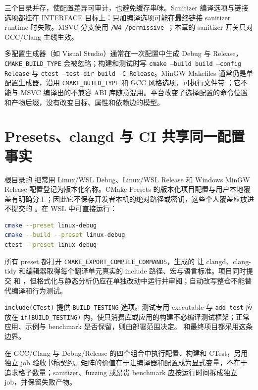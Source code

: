 三个目录并存，使配置差异可审计，也避免缓存串味。Sanitizer 编译选项与链接选项都挂在 INTERFACE 目标上：只加编译选项可能在最终链接 sanitizer runtime 时失败。MSVC 分支使用 \texttt{/W4 /permissive-}；本章的 sanitizer 开关只对 GCC/Clang 主线生效。

多配置生成器（如 Visual Studio）通常在一次配置中生成 Debug 与 Release，\texttt{CMAKE\_BUILD\_TYPE} 会被忽略；构建和测试时写 \texttt{cmake --build build --config Release} 与 \texttt{ctest --test-dir build -C Release}。MinGW Makefiles 通常仍是单配置生成器，沿用 \texttt{CMAKE\_BUILD\_TYPE} 和 GCC 风格选项，可执行文件带 ；它不能与 MSVC 编译出的不兼容 ABI 库随意混用。平台改变了选择配置的命令位置和产物后缀，没有改变目标、属性和依赖边的模型。

\section{Presets、clangd 与 CI 共享同一配置事实}

根目录的  把常用 Linux/WSL Debug、Linux/WSL Release 和 Windows MinGW Release 配置登记为版本化名称。CMake Presets 的版本化项目配置与用户本地覆盖有明确分工\autocite{cmakepresets}；因此它不保存开发者本机的绝对路径或密钥，这些个人覆盖应放进不提交的 。在 WSL 中可直接运行：

\begin{lstlisting}[language=bash,numbers=none]
cmake --preset linux-debug
cmake --build --preset linux-debug
ctest --preset linux-debug
\end{lstlisting}

所有 preset 都打开 \texttt{CMAKE\_EXPORT\_COMPILE\_COMMANDS}，生成的  让 clangd、clang-tidy 和编辑器取得每个翻译单元真实的 include 路径、宏与语言标准。项目同时提交  和 ，但格式化与静态分析仍应在单独改动中运行并审阅；自动改写整仓不能替代编译和行为测试。

\texttt{include(CTest)} 提供 \texttt{BUILD\_TESTING} 选项。测试专用 executable 与 \texttt{add\_test} 应放在 \texttt{if(BUILD\_TESTING)} 内，使只消费库或应用的构建不必编译测试框架；正常应用、示例与 benchmark 是否保留，则由部署范围决定。 和最终项目都采用这条边界。

 在 GCC/Clang 与 Debug/Release 的四个组合中执行配置、构建和 CTest，另用独立 job 验收书稿契约。矩阵的价值在于让编译器和配置成为显式变量，不在于追求格子数量；sanitizer、fuzzing 或昂贵 benchmark 应按运行时间拆成独立 job，并保留失败产物。

